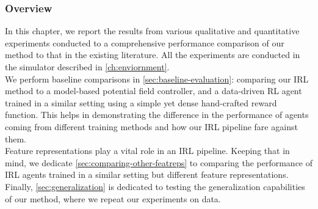 \label{ch:6}
\subsubsection*{Overview}
In this chapter, we report the results from various qualitative and quantitative experiments conducted to  a comprehensive performance comparison of our method to that in the existing literature. All the experiments are conducted in the simulator described in \autoref{ch:enviornment}. \\
We perform baseline comparisons in \autoref{sec:baseline-evaluation}: comparing our IRL method to a model-based potential field controller, and a data-driven RL agent trained in a similar setting using a simple yet dense hand-crafted reward function. This helps in demonstrating the difference in the performance of agents coming from different training methods and how our IRL pipeline fare against them.\\
 Feature representations play a vital role in an IRL pipeline. Keeping that in mind, we dedicate \autoref{sec:comparing-other-featreps} to comparing the performance of IRL agents trained in a similar setting but different feature representations.\\
 Finally, \autoref{sec:generalization} is dedicated to testing the generalization capabilities of our method, where we repeat our experiments on  data.

%

